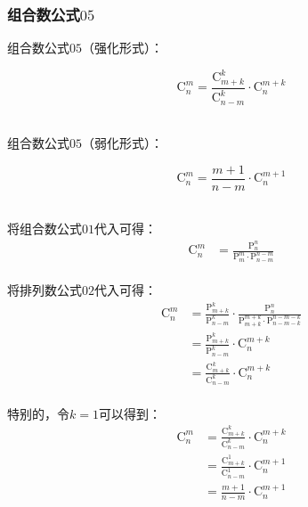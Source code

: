 \documentclass[UTF8]{ctexart}
\begin{document}
\subsubsection{组合数公式$05$}
    组合数公式$05$（强化形式）：
    \begin{large}
        \begin{equation*}
            \mathrm{C}_n^m=\frac{\mathrm{C}_{m+k}^k}{\mathrm{C}_{n-m}^k}\cdot\mathrm{C}_n^{m+k}
        \end{equation*}
    \end{large}\\
    组合数公式$05$（弱化形式）：
    \begin{large}
        \begin{equation*}
            \mathrm{C}_n^m=\frac{m+1}{n-m}\cdot\mathrm{C}_n^{m+1}
        \end{equation*}
    \end{large}\\
    将组合数公式$01$代入可得：
    \setcounter{equation}{0}
    \begin{align}
        \mathrm{C}_n^m
        &=\frac{\mathrm{P}_n^n}{\mathrm{P}_m^m\cdot\mathrm{P}_{n-m}^{n-m}}
    \end{align}\\
    将排列数公式$02$代入可得：
    \begin{align}
        \mathrm{C}_n^m
        &=\frac{\mathrm{P}_{m+k}^k}{\mathrm{P}_{n-m}^k}\cdot\frac{\mathrm{P}_n^n}{\mathrm{P}_{m+k}^{m+k}\cdot\mathrm{P}_{n-m-k}^{n-m-k}}\\[3mm]
        &=\frac{\mathrm{P}_{m+k}^k}{\mathrm{P}_{n-m}^k}\cdot\mathrm{C}_n^{m+k}\\[3mm]
        &=\frac{\mathrm{C}_{m+k}^k}{\mathrm{C}_{n-m}^k}\cdot\mathrm{C}_n^{m+k}
    \end{align}\\
    特别的，令$k=1$可以得到：
    \begin{align}
        \mathrm{C}_n^m
        &=\frac{\mathrm{C}_{m+k}^k}{\mathrm{C}_{n-m}^k}\cdot\mathrm{C}_n^{m+k}\\[3mm]
        &=\frac{\mathrm{C}_{m+k}^1}{\mathrm{C}_{n-m}^1}\cdot\mathrm{C}_n^{m+1}\\[3mm]
        &=\frac{m+1}{n-m}\cdot\mathrm{C}_n^{m+1}
    \end{align}

\newpage
\end{document}
